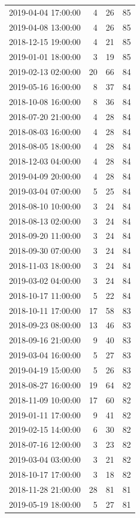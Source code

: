 \begin{tabular}{lrrr}
2019-04-04 17:00:00 & 4 & 26 & 85 \\
2019-04-08 13:00:00 & 4 & 26 & 85 \\
2018-12-15 19:00:00 & 4 & 21 & 85 \\
2019-01-01 18:00:00 & 3 & 19 & 85 \\
2019-02-13 02:00:00 & 20 & 66 & 84 \\
2019-05-16 16:00:00 & 8 & 37 & 84 \\
2018-10-08 16:00:00 & 8 & 36 & 84 \\
2018-07-20 21:00:00 & 4 & 28 & 84 \\
2018-08-03 16:00:00 & 4 & 28 & 84 \\
2018-08-05 18:00:00 & 4 & 28 & 84 \\
2018-12-03 04:00:00 & 4 & 28 & 84 \\
2019-04-09 20:00:00 & 4 & 28 & 84 \\
2019-03-04 07:00:00 & 5 & 25 & 84 \\
2018-08-10 10:00:00 & 3 & 24 & 84 \\
2018-08-13 02:00:00 & 3 & 24 & 84 \\
2018-09-20 11:00:00 & 3 & 24 & 84 \\
2018-09-30 07:00:00 & 3 & 24 & 84 \\
2018-11-03 18:00:00 & 3 & 24 & 84 \\
2019-03-02 04:00:00 & 3 & 24 & 84 \\
2018-10-17 11:00:00 & 5 & 22 & 84 \\
2018-10-11 17:00:00 & 17 & 58 & 83 \\
2018-09-23 08:00:00 & 13 & 46 & 83 \\
2018-09-16 21:00:00 & 9 & 40 & 83 \\
2019-03-04 16:00:00 & 5 & 27 & 83 \\
2019-04-19 15:00:00 & 5 & 26 & 83 \\
2018-08-27 16:00:00 & 19 & 64 & 82 \\
2018-11-09 10:00:00 & 17 & 60 & 82 \\
2019-01-11 17:00:00 & 9 & 41 & 82 \\
2019-02-15 14:00:00 & 6 & 30 & 82 \\
2018-07-16 12:00:00 & 3 & 23 & 82 \\
2019-03-04 03:00:00 & 3 & 21 & 82 \\
2018-10-17 17:00:00 & 3 & 18 & 82 \\
2018-11-28 21:00:00 & 28 & 81 & 81 \\
2019-05-19 18:00:00 & 5 & 27 & 81 \\

\end{tabular}
